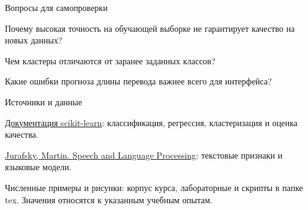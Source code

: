 \documentclass[aspectratio=169,12pt]{beamer}
\begin{document}
\begin{frame}{Вопросы для самопроверки}
\color{ink}
{\small Почему высокая точность на обучающей выборке не гарантирует качество на новых данных?
\par\vspace{0.6em}Чем кластеры отличаются от заранее заданных классов?
\par\vspace{0.6em}Какие ошибки прогноза длины перевода важнее всего для интерфейса?}

\end{frame}
\color{ink}
\begin{frame}{Источники и данные}
\color{ink}
{\small \href{https://scikit-learn.org/stable/user_guide.html}{Документация scikit-learn}: классификация, регрессия, кластеризация и оценка качества.
\par\vspace{0.6em}\href{https://web.stanford.edu/~jurafsky/slp3/}{Jurafsky, Martin. Speech and Language Processing}: текстовые признаки и языковые модели.
\par\vspace{0.6em}Численные примеры и рисунки: корпус курса, лабораторные и скрипты в папке tex. Значения относятся к указанным учебным опытам.}
\end{frame}
\end{document}
